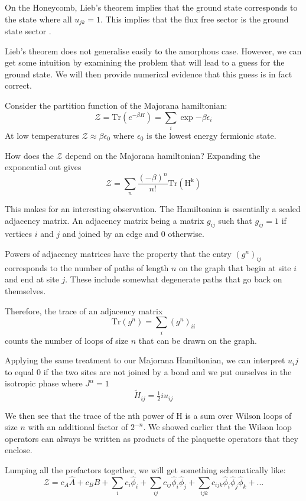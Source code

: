 On the Honeycomb, Lieb's theorem implies that the ground state corresponds to the state where all \(u_{jk} = 1\). This implies that the flux free sector is the ground state sector \autocite{lieb_flux_1994}.

Lieb's theorem does not generalise easily to the amorphous case. However, we can get some intuition by examining the problem that will lead to a guess for the ground state. We will then provide numerical evidence that this guess is in fact correct.

Consider the partition function of the Majorana hamiltonian: \[ \mathcal{Z} = \mathrm{Tr}\left( e^{-\beta H}\right) = \sum_i \exp{-\beta \epsilon_i}\] At low temperatures \(\mathcal{Z} \approx \beta \epsilon_0\) where \(\epsilon_0\) is the lowest energy fermionic state.

How does the \(\mathcal{Z}\) depend on the Majorana hamiltonian? Expanding the exponential out gives \[ \mathcal{Z} = \sum_n \frac{(-\beta)^n}{n!} \mathrm{Tr(H^k)} \]

This makes for an interesting observation. The Hamiltonian is essentially a scaled adjacency matrix. An adjacency matrix being a matrix \(g_{ij}\) such that \(g_{ij} = 1\) if vertices \(i\) and \(j\) and joined by an edge and 0 otherwise.

Powers of adjacency matrices have the property that the entry \((g^n)_{ij}\) corresponds to the number of paths of length \(n\) on the graph that begin at site \(i\) and end at site \(j\). These include somewhat degenerate paths that go back on themselves.

Therefore, the trace of an adjacency matrix \[\mathrm{Tr}(g^n) = \sum_i (g^n)_{ii}\] counts the number of loops of size \(n\) that can be drawn on the graph.

Applying the same treatment to our Majorana Hamiltonian, we can interpret \(u_ij\) to equal 0 if the two sites are not joined by a bond and we put ourselves in the isotropic phase where \(J^\alpha = 1\) \[ \tilde{H}_{ij} =  \tfrac{1}{2} i u_{ij}\]

We then see that the trace of the nth power of H is a sum over Wilson loops of size \(n\) with an additional factor of \(2^{-n}\). We showed earlier that the Wilson loop operators can always be written as products of the plaquette operators that they enclose.

Lumping all the prefactors together, we will get something schematically like: \[ \mathcal{Z} = c_A \hat{A} + c_B \hat{B} + \sum_i c_i \hat{\phi}_i + \sum_{ij} c_{ij}  \hat{\phi}_i \hat{\phi}_j + \sum_{ijk} c_{ijk}  \hat{\phi}_i \hat{\phi}_j \hat{\phi}_k + ...\]

